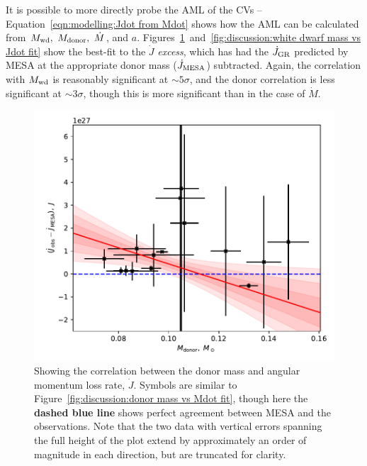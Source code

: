 It is possible to more directly probe the AML of the CVs -- Equation~\ref{eqn:modelling:Jdot from Mdot} shows how the AML can be calculated from $M_{\rm wd},\ M_{\rm donor},\ \dot M$, and $a$.
Figures~\ref{fig:discussion:donor mass vs Jdot fit}~and~\ref{fig:discussion:white dwarf mass vs Jdot fit} show the best-fit to the $\dot J$ \textit{excess}, which has had the $\dot J_{\rm GR}$ predicted by MESA at the appropriate donor mass ($\dot J_{\rm MESA}$) subtracted.
Again, the correlation with $M_{\rm wd}$ is reasonably significant at $\sim 5\sigma$, and the donor correlation is less significant at $\sim 3\sigma$, though this is more significant than in the case of $\dot M$.
\begin{figure}
    \centering
    \includegraphics[width=\textwidth]{figures/results/Mdot/Mr_Jdot_ex.pdf}
    \caption{Showing the correlation between the donor mass and angular momentum loss rate, $\dot J$. Symbols are similar to Figure~\ref{fig:discussion:donor mass vs Mdot fit}, though here the {\bf dashed blue line} shows perfect agreement between MESA and the observations. Note that the two data with vertical errors spanning the full height of the plot extend by approximately an order of magnitude in each direction, but are truncated for clarity.}
    \label{fig:discussion:donor mass vs Jdot fit}
\end{figure}
